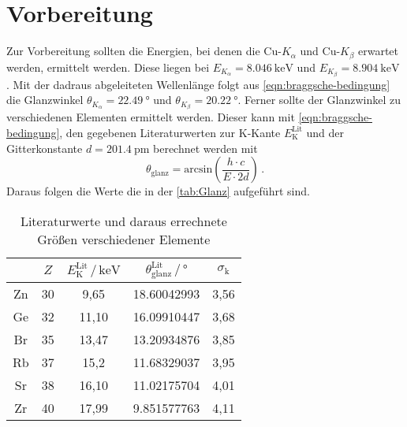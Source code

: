 \section{Vorbereitung}
Zur Vorbereitung sollten die Energien, bei denen die Cu-$K_\alpha$ und Cu-$K_\beta$
erwartet werden, ermittelt werden. Diese liegen bei $E_{K_\alpha} = \SI{8.046}{\kilo\eV}$ und 
$E_{K_\beta} = \SI{8.904}{\kilo\eV}$ \cite{ld-didactic.de}. Mit der dadraus abgeleiteten Wellenlänge folgt aus
\autoref{eqn:braggsche-bedingung} die Glanzwinkel $\theta_{K_\alpha} = \SI{22.49}{\degree}$ 
und $\theta_{K_\beta} = \SI{20.22}{\degree}$.
Ferner sollte der Glanzwinkel zu verschiedenen Elementen ermittelt 
werden. Dieser kann mit \autoref{eqn:braggsche-bedingung}, den gegebenen Literaturwerten 
zur K-Kante $E_\text{K}^\text{Lit}$ \cite{wissen} und der Gitterkonstante 
$d = \SI{201.4}{\pico\meter}$ berechnet werden mit 
\begin{equation}
	\theta_\text{glanz} = \text{arcsin}\left(\frac{h \cdot c}{E \cdot 2d}\right) \, .
	\label{eqn:theta}
\end{equation}
Daraus folgen die Werte die in der \autoref{tab:Glanz} aufgeführt sind. 
\begin{table}
	\centering
	\caption{Literaturwerte und daraus errechnete Größen verschiedener Elemente}
	\label{tab:Glanz}
	\begin{tabular}{c c c c c}
		\toprule
		$ $ & $Z$ & $E_\text{K}^\text{Lit} \,/\, \si{\kilo\eV}$
		    & $\theta_\text{glanz}^\text{Lit} \,/\, \si{\degree}$ & 
		    $\sigma_\text{k}$\\
		    \midrule 
		Zn & 30 &  9,65 & 18.60042993 & 3,56 \\
		Ge & 32 & 11,10 & 16.09910447 & 3,68 \\
		Br & 35 & 13,47 & 13.20934876 & 3,85 \\
		Rb & 37 & 15,2 & 11.68329037 & 3,95 \\
		Sr & 38 & 16,10 & 11.02175704 & 4,01 \\
		Zr & 40 & 17,99 &  9.851577763 & 4,11 \\
		\bottomrule
	\end{tabular}
\end{table}

